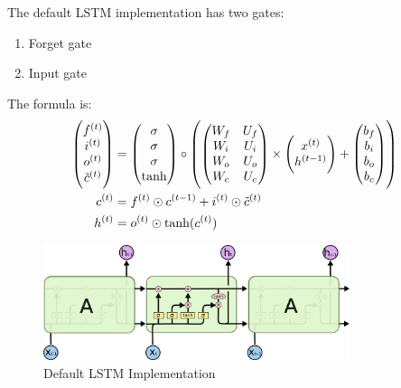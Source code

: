 \begin{definition}
The default LSTM implementation has two gates:
\begin{enumerate}
    \item Forget gate
    \item Input gate
\end{enumerate}

The formula is:
\begin{equation}
    \begin{aligned}
        \begin{pmatrix}
            {f}^{(t)} \\
            {i}^{(t)} \\
            {o}^{(t)} \\
            {\tilde{c}}^{(t)}
        \end{pmatrix} &= \begin{pmatrix}
            \sigma \\
            \sigma \\
            \sigma \\
            \tanh
        \end{pmatrix} \circ \left( \begin{pmatrix}
            W_f & U_f \\
            W_i & U_i \\
            W_o & U_o \\
            W_c & U_c
        \end{pmatrix} \times \begin{pmatrix}
            {x}^{(t)} \\
            {h}^{(t-1)}
        \end{pmatrix} + \begin{pmatrix}
            b_f \\
            b_i \\
            b_o \\
            b_c
        \end{pmatrix} \right) \\
        {c}^{(t)} &= {f}^{(t)} \odot {c}^{(t-1)} + {i}^{(t)} \odot {\tilde{c}}^{(t)} \\
        {h}^{(t)} &= {o}^{(t)} \odot \tanh({c}^{(t)})
    \end{aligned}
\end{equation}

\begin{figure}[H]
\includegraphics[width=0.8\textwidth]{machine_learning/pic/04/LSTM3-chain.png}
\centering
\caption{Default LSTM Implementation}
\end{figure}

\end{definition}


